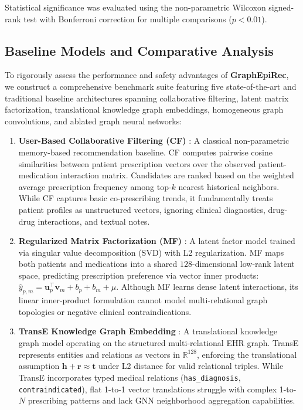 \documentclass[11pt,a4paper]{article}
\begin{document}
Statistical significance was evaluated using the non-parametric Wilcoxon signed-rank test with Bonferroni correction for multiple comparisons ($p < 0.01$).

\subsection{Baseline Models and Comparative Analysis}

To rigorously assess the performance and safety advantages of \textbf{GraphEpiRec}, we construct a comprehensive benchmark suite featuring five state-of-the-art and traditional baseline architectures spanning collaborative filtering, latent matrix factorization, translational knowledge graph embeddings, homogeneous graph convolutions, and ablated graph neural networks:

\begin{enumerate}[leftmargin=*]
    \item \textbf{User-Based Collaborative Filtering (CF)} \cite{koren2009matrix}: A classical non-parametric memory-based recommendation baseline. CF computes pairwise cosine similarities between patient prescription vectors over the observed patient-medication interaction matrix. Candidates are ranked based on the weighted average prescription frequency among top-$k$ nearest historical neighbors. While CF captures basic co-prescribing trends, it fundamentally treats patient profiles as unstructured vectors, ignoring clinical diagnostics, drug-drug interactions, and textual notes.
    
    \item \textbf{Regularized Matrix Factorization (MF)} \cite{koren2009matrix}: A latent factor model trained via singular value decomposition (SVD) with L2 regularization. MF maps both patients and medications into a shared $128$-dimensional low-rank latent space, predicting prescription preference via vector inner products: $\hat{y}_{p,m} = \mathbf{u}_p^\top \mathbf{v}_m + b_p + b_m + \mu$. Although MF learns dense latent interactions, its linear inner-product formulation cannot model multi-relational graph topologies or negative clinical contraindications.
    
    \item \textbf{TransE Knowledge Graph Embedding} \cite{bordes2013translating}: A translational knowledge graph model operating on the structured multi-relational EHR graph. TransE represents entities and relations as vectors in $\mathbb{R}^{128}$, enforcing the translational assumption $\mathbf{h} + \mathbf{r} \approx \mathbf{t}$ under L2 distance for valid relational triples. While TransE incorporates typed medical relations (\texttt{has\_diagnosis}, \texttt{contraindicated}), flat 1-to-1 vector translations struggle with complex 1-to-$N$ prescribing patterns and lack GNN neighborhood aggregation capabilities.
    

\end{enumerate}
\end{document}
